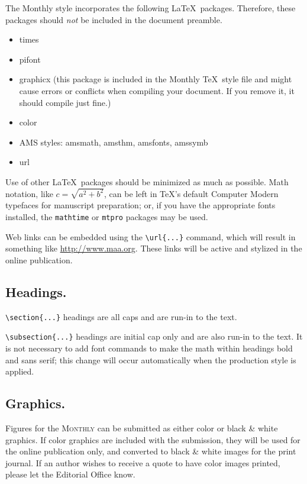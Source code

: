\documentclass{article}
\theoremstyle{theorem}
\theoremstyle{definition}
\begin{document}
The {\sc Monthly} style incorporates the following \LaTeX\ packages.  Therefore, these packages should \textit{not} be included in the document preamble.
\begin{itemize}
\item times
\item pifont
\item graphicx (this package is included in the {\sc Monthly} \TeX\ style file and might cause errors or conflicts when compiling your document.  If you remove it, it should compile just fine.)
\item color
\item AMS styles: amsmath, amsthm, amsfonts, amssymb
\item url
\end{itemize}
Use of other \LaTeX\ packages should be minimized as much as possible. Math notation, like $c = \sqrt{a^2 +b^2}$, can be left in \TeX's default Computer Modern typefaces for manuscript preparation; or, if you have the appropriate fonts installed, the \texttt{mathtime} or \texttt{mtpro} packages may be used.

Web links can be embedded using the \verb~\url{...}~ command, which will result in something like \url{http://www.maa.org}.  These links will be active and stylized in the online publication.

\subsection{Headings.}
\verb~\section{...}~ headings are all caps and are run-in to the text.  

\verb~\subsection{...}~ headings are initial cap only and are also run-in to the text.  It is not necessary to add font commands to make the math within headings bold and sans serif; this change will occur automatically when the production style is applied.

\subsection{Graphics.}

Figures for the \textsc{Monthly} can be submitted as either color or black \& white graphics.  If color graphics are included with the submission, they will be used for the online publication only, and converted to black \& white images for the print journal.  If an author wishes to receive a quote to have color images printed, please let the Editorial Office know.
\end{document}
